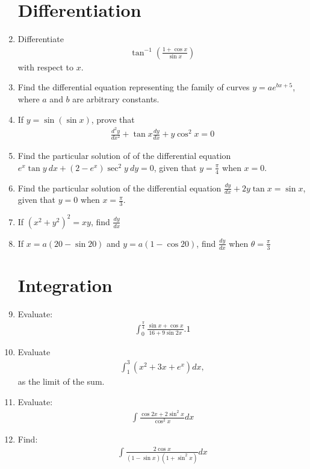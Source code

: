\documentclass[10pt,-letter paper]{article}
\providecommand{\brak}[1]{\ensuremath{\left(#1\right)}}
\begin{document}
\begin{enumerate}
   \section{Differentiation}
 
 \item Differentiate 
	\begin{align*}
	 \tan^{-1}\brak{\frac{1+\cos x}{\sin x}} 
	\end{align*} 
		with respect to $x$.
  

\item Find the differential equation representing the family of curves $y=ae^{bx+5}$, where $a$ and $b$ are arbitrary constants.

\item If $y=\sin\brak{\sin x}$, prove that 
		\begin{align*}
			\frac{d^{2}y}{dx^{2}}+\tan x \frac{dy}{dx}+y\cos^{2}x=0
		\end{align*}
	\item Find the particular solution of of the differential equation $e^{x}\tan y~ dx +\brak{2-e^{x}}\sec^{2} y ~dy=0$, given that $y=\frac{\pi}{4}$ when $x=0$. 
	\item Find the particular solution of the differential equation  $\frac{dy}{dx}+2y\tan x =\sin x$, given that $y=0$ when $x=\frac{\pi}{3}$.
 
 \item If ${\brak{x^{2}+y^{2}}}^{2}=xy$, find $\frac{dy}{dx}$

\item If $x=a\brak{20-\sin 20}$ and $y=a\brak{1-\cos 20}$, find $\frac{dy}{dx}$ when $\theta=\frac{\pi}{3}$

\section{Integration}
\item Evaluate: 
\begin{align*}
	\int_{0}^{\frac{\pi}{4}}\frac{\sin x+\cos x}{16+9 \sin 2x}.1
\end{align*}
\item Evaluate 
	\begin{align*}
		\int_{1}^{3} \brak{x^{2}+3x+e^{x}}dx,
	\end{align*}
	as the limit of the sum.
\item Evaluate:
			\begin{align*}
			\int\frac{\cos 2x+2\sin^{2}x}{\cos^{2}x}dx
				\end{align*}
\item Find:
	\begin{align*}
		\int\frac{2\cos x}{\brak{1-\sin x}\brak{1+\sin^{2}x}}dx
	\end{align*}
 

\end{enumerate}
\end{document}
